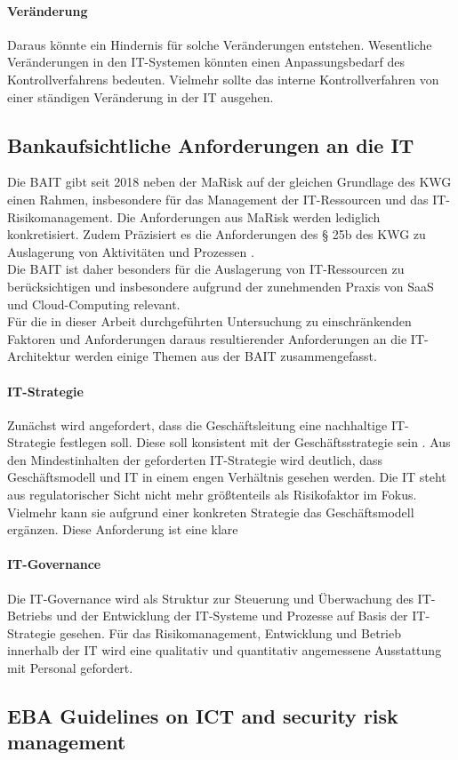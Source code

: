 \paragraph{Veränderung}
Daraus könnte ein Hindernis für solche Veränderungen entstehen. Wesentliche Veränderungen in den IT-Systemen könnten einen Anpassungsbedarf des Kontrollverfahrens bedeuten. Vielmehr sollte das interne Kontrollverfahren von einer ständigen Veränderung in der IT ausgehen.

\subsection{Bankaufsichtliche Anforderungen an die IT}
Die \ac{BAIT} gibt seit 2018 neben der \ac{MaRisk} auf der gleichen Grundlage des \ac{KWG} einen  Rahmen, insbesondere für das Management der IT-Ressourcen und das IT-Risikomanagement. Die Anforderungen aus \ac{MaRisk} werden lediglich konkretisiert. Zudem Präzisiert es die Anforderungen des § 25b des
\ac{KWG} zu Auslagerung von Aktivitäten und Prozessen \cite{BAIT:2018}.
\\
Die \ac{BAIT} ist daher besonders für die Auslagerung von IT-Ressourcen zu berücksichtigen und insbesondere aufgrund der zunehmenden Praxis von \ac{SaaS} und Cloud-Computing relevant.
\\
Für die in dieser Arbeit durchgeführten Untersuchung zu einschränkenden Faktoren und Anforderungen daraus resultierender Anforderungen an die IT-Architektur werden einige Themen aus der \ac{BAIT} zusammengefasst.


\paragraph{IT-Strategie} Zunächst wird angefordert, dass die Geschäftsleitung eine nachhaltige IT-Strategie festlegen soll. Diese soll konsistent mit der Geschäftsstrategie sein \cite{BAIT:2018}. 
Aus den Mindestinhalten der geforderten IT-Strategie wird deutlich, dass Geschäftsmodell und IT in einem engen Verhältnis gesehen werden. Die IT steht aus regulatorischer Sicht nicht mehr größtenteils als Risikofaktor im Fokus. Vielmehr kann sie aufgrund einer konkreten Strategie das Geschäftsmodell ergänzen. Diese Anforderung ist eine klare 

\paragraph{IT-Governance} Die IT-Governance wird als Struktur zur Steuerung und Überwachung des IT-Betriebs und der Entwicklung der IT-Systeme und Prozesse auf Basis der IT-Strategie \cite{BAIT:2018} gesehen. Für das Risikomanagement, Entwicklung und Betrieb innerhalb der IT wird eine qualitativ und quantitativ angemessene Ausstattung mit Personal gefordert.



\subsection{EBA Guidelines on ICT and security risk management}

